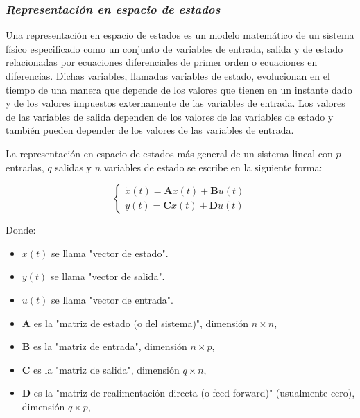 \subsubsection*{\it{Representación en espacio de estados}}
\vspace{-0.25cm}

Una representación en espacio de estados es un modelo matemático de un sistema físico especificado como un conjunto de
variables de entrada, salida y de estado relacionadas por ecuaciones diferenciales de primer orden o ecuaciones en
diferencias. Dichas variables, llamadas variables de estado, evolucionan en el tiempo de una manera que depende
de los valores que tienen en un instante dado y de los valores impuestos externamente de las variables de entrada.
Los valores de las variables de salida dependen de los valores de las variables de estado y también pueden depender
de los valores de las variables de entrada.

La representación en espacio de estados más general de un sistema lineal con \( p \) entradas, \( q \) salidas y \( n \)
variables de estado se escribe en la siguiente forma:

\vspace{-0.5cm}
\begin{equation}
    \begin{cases}
        \dot{x}(t) = \textbf{A} x(t) + \textbf{B} u(t) \\
        y(t) = \textbf{C} x(t) + \textbf{D} u(t)
    \end{cases}
\end{equation}
\vspace{-0.5cm}

Donde:

\begin{itemize}[noitemsep]
    \item \( x(t) \) se llama "vector de estado".
    \item \( y(t) \) se llama "vector de salida".
    \item \( u(t) \) se llama "vector de entrada".
    \item \( \textbf{A} \) es la "matriz de estado (o del sistema)", dimensión \( n \times n \),
    \item \( \textbf{B} \) es la "matriz de entrada", dimensión \( n \times p \),
    \item \( \textbf{C} \) es la "matriz de salida", dimensión \( q \times n \),
    \item \( \textbf{D} \) es la "matriz de realimentación directa (o feed-forward)" (usualmente cero), dimensión \( q \times p \),
\end{itemize}

